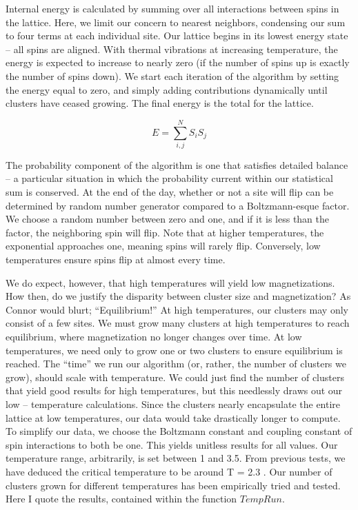 \documentclass[a4paper]{article}
\begin{document}
Internal energy is calculated by summing over all interactions between spins in the lattice. Here, we limit our concern to nearest neighbors, condensing our sum to four terms at each individual site. Our lattice begins in its lowest energy state – all spins are aligned. With thermal vibrations at increasing temperature, the energy is expected to increase to nearly zero (if the number of spins up is exactly the number of spins down). We start each iteration of the algorithm by setting the energy equal to zero, and simply adding contributions dynamically until clusters have ceased growing. The final energy is the total for the lattice. 

$$E = \sum_{i,j}^{N} S_i S_j$$


The probability component of the algorithm is one that satisfies detailed balance – a particular situation in which the probability current within our statistical sum is conserved. At the end of the day, whether or not a site will flip can be determined by random number generator compared to a Boltzmann-esque factor. We choose a random number between zero and one, and if it is less than the factor, the neighboring spin will flip. Note that at higher temperatures, the exponential approaches one, meaning spins will rarely flip. Conversely, low temperatures ensure spins flip at almost every time. 


We do expect, however, that high temperatures will yield low magnetizations. How then, do we justify the disparity between cluster size and magnetization? As Connor would blurt; “Equilibrium!”  At high temperatures, our clusters may only consist of a few sites. We must grow many clusters at high temperatures to reach equilibrium, where magnetization no longer changes over time. At low temperatures, we need only to grow one or two clusters to ensure equilibrium is reached. The “time” we run our algorithm (or, rather, the number of clusters we grow), should scale with temperature. We could just find the number of clusters that yield good results for high temperatures, but this needlessly draws out our low – temperature calculations. Since the clusters nearly encapsulate the entire lattice at low temperatures, our data would take drastically longer to compute. To simplify our data, we choose the Boltzmann constant and coupling constant of spin interactions to both be one. This yields unitless results for all values. Our temperature range, arbitrarily, is set between 1 and 3.5. From previous tests, we have deduced the critical temperature to be around T = 2.3 . Our number of clusters grown for different temperatures has been empirically tried and tested. Here I quote the results, contained within the function $Temp  Run$. 
\end{document}
